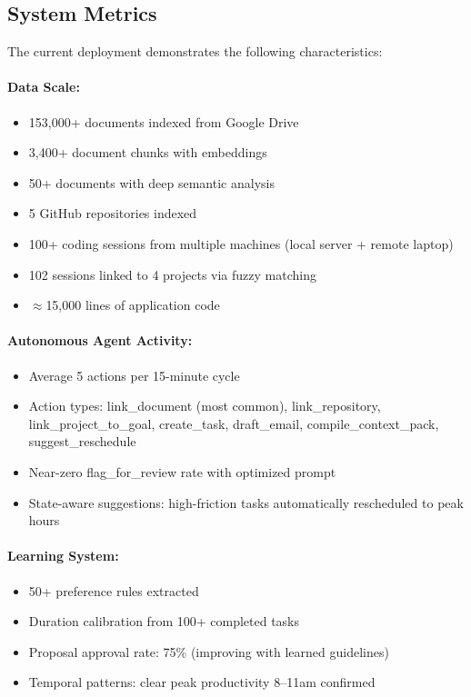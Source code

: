 \documentclass[11pt,a4paper]{article}
\begin{document}
\subsection{System Metrics}

The current deployment demonstrates the following characteristics:

\paragraph{Data Scale:}
\begin{itemize}
    \item 153,000+ documents indexed from Google Drive
    \item 3,400+ document chunks with embeddings
    \item 50+ documents with deep semantic analysis
    \item 5 GitHub repositories indexed
    \item 100+ coding sessions from multiple machines (local server + remote laptop)
    \item 102 sessions linked to 4 projects via fuzzy matching
    \item $\approx$15,000 lines of application code
\end{itemize}

\paragraph{Autonomous Agent Activity:}
\begin{itemize}
    \item Average 5 actions per 15-minute cycle
    \item Action types: link\_document (most common), link\_repository, link\_project\_to\_goal, create\_task, draft\_email, compile\_context\_pack, suggest\_reschedule
    \item Near-zero flag\_for\_review rate with optimized prompt
    \item State-aware suggestions: high-friction tasks automatically rescheduled to peak hours
\end{itemize}

\paragraph{Learning System:}
\begin{itemize}
    \item 50+ preference rules extracted
    \item Duration calibration from 100+ completed tasks
    \item Proposal approval rate: 75\% (improving with learned guidelines)
    \item Temporal patterns: clear peak productivity 8--11am confirmed
\end{itemize}
\end{document}
